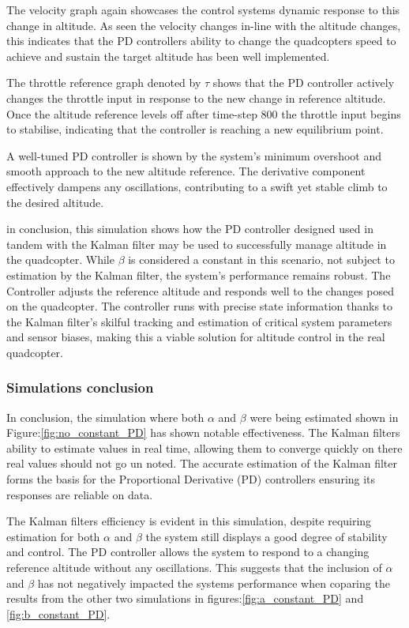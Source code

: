 \documentclass{report}
\begin{document}
The velocity graph again showcases the control systems dynamic response to this
change in altitude. As seen the velocity changes in-line with the altitude
changes, this indicates that the PD controllers ability to change the
quadcopters speed to achieve and sustain the target altitude has been well
implemented.

The throttle reference graph denoted by \(\tau\) shows that the PD controller
actively changes the throttle input in response to the new change in reference
altitude. Once the altitude reference levels off after time-step 800 the throttle
input begins to stabilise, indicating that the controller is reaching a new
equilibrium point.
 
A well-tuned PD controller is shown by the system's minimum overshoot and smooth
approach to the new altitude reference. The derivative component effectively
dampens any oscillations, contributing to a swift yet stable climb to the
desired altitude.

in conclusion, this simulation shows how the PD controller designed used in
tandem with the Kalman filter may be used to successfully manage altitude in the
quadcopter. While \(\beta\) is considered a constant in this scenario, not
subject to estimation by the Kalman filter, the system's performance remains
robust. The Controller adjusts the reference altitude and responds well to the
changes posed on the quadcopter. The controller runs with precise state
information thanks to the Kalman filter's skilful tracking and estimation of
critical system parameters and sensor biases, making this a viable solution for
altitude control in the real quadcopter.


\subsubsection*{Simulations conclusion}
In conclusion, the simulation where both \(\alpha\) and \(\beta\) were being
estimated shown in Figure:\ref{fig:no_constant_PD} has shown notable
effectiveness. The Kalman filters ability to estimate values in real time,
allowing them to converge quickly on there real values should not go un noted.
The accurate estimation of the Kalman filter forms the basis for the
Proportional Derivative (PD) controllers ensuring its responses are reliable on
data.

The Kalman filters efficiency is evident in this simulation, despite requiring
estimation for both \(\alpha\) and \(\beta\) the system still displays a good
degree of stability and control. The PD controller allows the system to respond
to a changing reference altitude without any oscillations. This suggests that
the inclusion of \(\alpha\) and \(\beta\) has not negatively impacted the
systems performance when coparing the results from the other two simulations in
figures:\ref{fig:a_constant_PD} and \ref{fig:b_constant_PD}.
\end{document}
